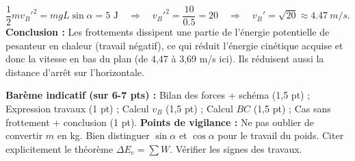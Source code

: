\documentclass[11pt]{article}
\begin{document}
\begin{corrige}
\begin{enumerate}
\[
\frac{1}{2}mv_B'^2 = mgL\sin\alpha = 5 \text{ J} \quad \Rightarrow \quad v_B'^2 = \frac{10}{\num{0,5}} = 20 \quad \Rightarrow \quad v_B' = \sqrt{20} \approx \SI{4,47}{m/s}.
\]
\textbf{Conclusion :} Les frottements dissipent une partie de l'énergie potentielle de pesanteur en chaleur (travail négatif), ce qui réduit l'énergie cinétique acquise et donc la vitesse en bas du plan (de 4,47 à 3,69 m/s ici). Ils réduisent aussi la distance d'arrêt sur l'horizontale.
\end{enumerate}
\textbf{Barème indicatif (sur 6-7 pts) :} Bilan des forces + schéma (1,5 pt) ; Expression travaux (1 pt) ; Calcul $v_B$ (1,5 pt) ; Calcul $BC$ (1,5 pt) ; Cas sans frottement + conclusion (1 pt).
\textbf{Points de vigilance :} Ne pas oublier de convertir $m$ en kg. Bien distinguer $\sin\alpha$ et $\cos\alpha$ pour le travail du poids. Citer explicitement le théorème $\Delta E_c = \sum W$. Vérifier les signes des travaux.
\end{corrige}
\end{document}
